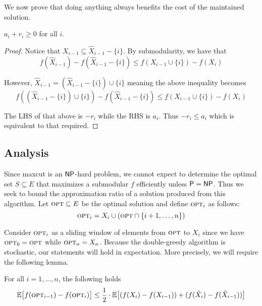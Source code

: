 \documentclass{article}
\begin{document}
We now prove that doing anything always benefits the cost of the maintained solution.
\begin{claim}\label{claim:do-something}
$a_i + r_i \geq 0$ for all $i$.
\end{claim}
\begin{proof}
Notice that $X_{i-1} \subseteq \hat{X}_{i-1} - \{ i \}$. By submodularity, we have that
\begin{equation*}
f(\hat{X}_{i-1}) - f(\hat{X}_{i-1} - \{ i \}) \leq f(X_{i-1} \cup \{ i \}) - f(X_i)
\end{equation*}

However, $\hat{X}_{i-1} = (\hat{X}_{i-1} - \{ i \}) \cup \{ i \}$ meaning the above inequality becomes
\begin{equation*}
f((\hat{X}_{i-1} - \{ i \}) \cup \{ i \}) - f(\hat{X}_{i-1} - \{ i \}) \leq f(X_{i-1} \cup \{ i \}) - f(X_i)
\end{equation*}

The LHS of that above is $-r_i$ while the RHS is $a_i$. Thus $-r_i \leq a_i$ which is equivalent to that required.
\end{proof}

\subsection{Analysis}

Since maxcut is an $\mathsf{NP}$-hard problem, we cannot expect to determine the optimal set $S \subseteq E$ that maximizes a submodular $f$ efficiently unless $\mathsf{P} = \mathsf{NP}$. Thus we seek to bound the approximation ratio of a solution produced from this algorithm. Let $\textup{\textsc{opt}} \subseteq E$ be the optimal solution and define $\textup{\textsc{opt}}_i$ as follows:
\begin{equation*}
\textup{\textsc{opt}}_i = X_i \cup (\textup{\textsc{opt}} \cap \{ i+1, \ldots, n \})
\end{equation*}

Consider $\textup{\textsc{opt}}_i$ as a sliding window of elements from $\textup{\textsc{opt}}$ to $X_i$ since we have $\textup{\textsc{opt}}_0 = \textup{\textsc{opt}}$ while $\textup{\textsc{opt}}_n = X_n$. Because the double-greedy algorithm is stochastic, our statements will hold in expectation. More precisely, we will require the following lemma.
\begin{lemma}\label{lem:big-boi}
For all $i = 1, \ldots, n$, the following holds
\begin{equation}\label{eqn:big-boi}
\mathbb{E} \big[ f(\textup{\textsc{opt}}_{i-1}) - f(\textup{\textsc{opt}}_i) \big]
\leq \frac{1}{2} \cdot \mathbb{E} \big[ (f(X_i) - f(X_{i-1})) + (f(\hat{X}_i) - f(\hat{X}_{i-1})) \big]
\end{equation}
\end{lemma}
\end{document}
